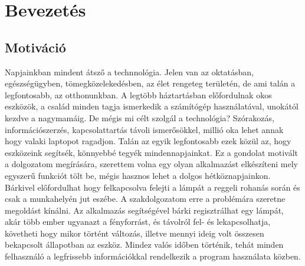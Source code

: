 \documentclass[a4paper,12pt]{report}
\begin{document}

    




    \tableofcontents

    \clearpage
    \setcounter{page}{1}


    \chapter{Bevezetés}

    \section{Motiváció}
    Napjainkban mindent átsző a technnológia. Jelen van az oktatásban, egészségügyben, tömegközelekedésben, az élet rengeteg
    területén, de ami talán a legfontosabb, az otthonunkban. A legtöbb háztartásban előfordulnak okos eszközök, a család
    minden tagja ismerkedik a számítógép használatával, unokától kezdve a nagymamáig. De mégis mi célt szolgál a technológia?
    Szórakozás, információszerzés, kapcsolattartás távoli ismerősökkel, millió oka lehet annak hogy valaki laptopot ragadjon.
    Talán az egyik legfontosabb ezek közül az, hogy eszközeink segítsék, könnyebbé tegyék mindennapjainkat. Ez a gondolat
    motivált a dolgozatom megírására, szerettem volna egy olyan alkalmazást elkészíteni mely egyszerű funkciót tölt be, mégis
    hasznos lehet a dolgos hétköznapjainkon. Bárkivel előfordulhat hogy felkapcsolva felejti a lámpát a reggeli rohanás során
    és csak a munkahelyén jut eszébe. A szakdolgozatom erre a problémára szeretne megoldást kínálni. Az alkalmazás segítségével
    bárki regisztrálhat egy lámpát, akár több ember ugyanazt a fényforrást, és távolról fel- és lekapcsolhatja, követheti hogy
    mikor történt változás, illetve mennyi ideig volt összesen bekapcsolt állapotban az eszköz. Mindez valós időben történik,
    tehát minden felhasználó a legfrissebb információkkal rendelkezik a program használata közben.
\end{document}
